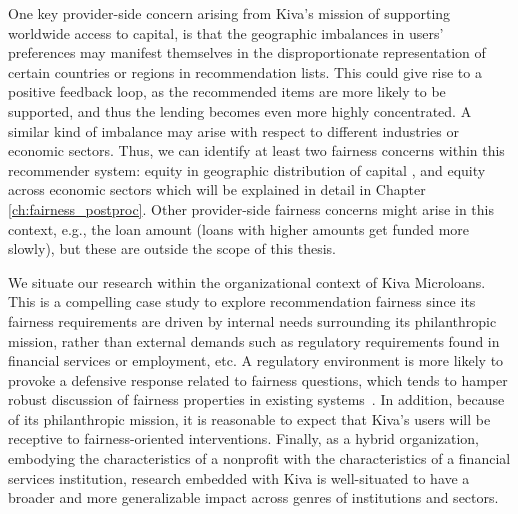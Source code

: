     One key provider-side concern arising from Kiva's mission of supporting worldwide access to capital, is that the geographic imbalances in users' preferences may manifest themselves in the disproportionate representation of certain countries or regions in recommendation lists. This could give rise to a positive feedback loop, as the recommended items are more likely to be supported, and thus the lending becomes even more highly concentrated. A similar kind of imbalance may arise with respect to different industries or economic sectors. Thus, we can identify at least two fairness concerns within this recommender system: equity in geographic distribution of capital \cite{liu2019personalized}, and equity across economic sectors \cite{sonboli2020opportunistic} which will be explained in detail in Chapter \ref{ch:fairness_postproc}. Other provider-side fairness concerns might arise in this context, e.g., the loan amount (loans with higher amounts get funded more slowly), but these are outside the scope of this thesis.
    
    We situate our research within the organizational context of Kiva Microloans. This is a compelling case study to explore recommendation fairness since its fairness requirements are driven by internal needs surrounding its philanthropic mission, rather than external demands such as regulatory requirements found in financial services or employment, etc. A regulatory environment is more likely to provoke a defensive response related to fairness questions, which tends to hamper robust discussion of fairness properties in existing systems~\cite{chen2018fair,holstein2019improving}. In addition, because of its philanthropic mission, it is reasonable to expect that Kiva's users will be receptive to fairness-oriented interventions. Finally, as a hybrid organization, embodying the characteristics of a nonprofit with the characteristics of a financial services institution, research embedded with Kiva is well-situated to have a broader and more generalizable impact across genres of institutions and sectors.

    


